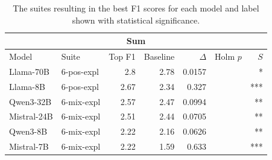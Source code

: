 \begin{table}
    \begin{tabular}{ll|rrrrr}
    \toprule
    \multicolumn{7}{c}{\textbf{Sum}} \\
    \midrule
    Model & Suite & Top F1 & Baseline & $\Delta$ & Holm $p$ & $S$ \\
    \midrule
    Llama-70B & 6-pos-expl & 2.8 & 2.78 & 0.0157 &  & * \\
    Llama-8B & 6-pos-expl & 2.67 & 2.34 & 0.327 &  & *** \\
    Qwen3-32B & 6-mix-expl & 2.57 & 2.47 & 0.0994 &  & ** \\
    Mistral-24B & 6-mix-expl & 2.51 & 2.44 & 0.0705 &  & ** \\
    Qwen3-8B & 6-mix-expl & 2.22 & 2.16 & 0.0626 &  & ** \\
    Mistral-7B & 6-mix-expl & 2.22 & 1.59 & 0.633 &  & *** \\
    \bottomrule
    \end{tabular}

    \caption{The suites resulting in the best F1 scores for each model and label shown with statistical significance.}
    \label{tab:best_with_mcnemar}
\end{table}